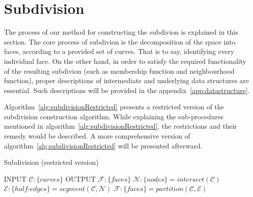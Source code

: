 \section{Subdivision}
The process of our method for constructing the subdivion is explained in this section.
The core process of subdivion is the decomposition of the space into faces, according to a provided set of curves.
That is to say, identifying every individual face.
On the other hand, in order to satisfy the required functionality of the resulting subdivion (such as membership function and neighbourhood function), proper descriptions of intermediate and underlying data structures are essential.
Such descriptions will be provided in the appendix~\ref{app:datastructure}.\bigskip

Algorithm~\ref{alg:subdivisionRestricted} presents a restricted version of the subdivision construction algorithm.
While explaining the sub-procedures mentioned in algorithm~\ref{alg:subdivisionRestricted}, the restrictions and their remedy would be described.
A more comprehensive version of algorithm~\ref{alg:subdivisionRestricted} will be presented afterward.

\begin{algorithm}
  \caption {Subdivision (restricted version)}
  \label{alg:subdivisionRestricted}
  \begin{algorithmic}    
    \STATE INPUT  $\mathcal{C}:\{curves\}$
    \STATE OUTPUT  $\mathcal{F}:\{faces\}$
    \STATE \quad
    \STATE $\mathcal{N}:\{nodes\} = \mathit{intersect} \left( \mathcal{C} \right)$
    \STATE $\mathcal{E}:\{half\text{-}edges\} = \mathit{segment} \left( \mathcal{C}, \mathcal{N} \right)$
    \STATE $ \mathcal{F}:\{faces\} = \mathit{partition} \left(\mathcal{C},\mathcal{E} \right)$
  \end{algorithmic}
\end{algorithm}

